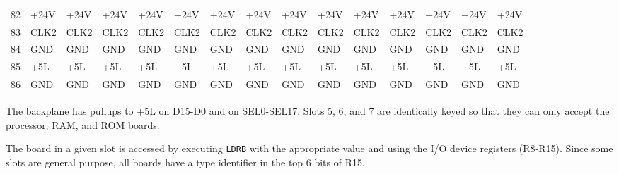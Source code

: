 \documentclass[hidelinks,11pt]{article}
\newcommand{\gap}{\bigskip\noindent}
\newlength{\bit}
\begin{document}
\begin{tiny}
\begin{tabularx}{\textwidth}{|l|X|X|X|X|X|X|X|X|X|X|X|X|X|X|}
    82 & +24V & +24V & +24V & +24V & +24V & +24V & +24V & +24V & +24V & +24V & +24V & +24V & +24V & +24V \\
    83 & CLK2 & CLK2 & CLK2 & CLK2 & CLK2 & CLK2 & CLK2 & CLK2 & CLK2 & CLK2 & CLK2 & CLK2 & CLK2 & CLK2 \\
    84 & GND & GND & GND & GND & GND & GND & GND & GND & GND & GND & GND & GND & GND & GND \\
    85 & +5L & +5L & +5L & +5L & +5L & +5L & +5L & +5L & +5L & +5L & +5L & +5L & +5L & +5L \\
    86 & GND & GND & GND & GND & GND & GND & GND & GND & GND & GND & GND & GND & GND & GND \\
    \hline
  \end{tabularx}
\end{tiny}
\vfill
\pagebreak

\gap
The backplane has pullups to +5L on D15-D0 and on SEL0-SEL17.
Slots 5, 6, and 7 are identically keyed so that they can only accept the processor, RAM, and ROM boards.

\gap
The board in a given slot is accessed by executing \texttt{LDRB} with the appropriate value and using the I/O device registers (R8-R15). Since some slots are general purpose, all boards have a type identifier in the top 6 bits of R15.
\end{document}
